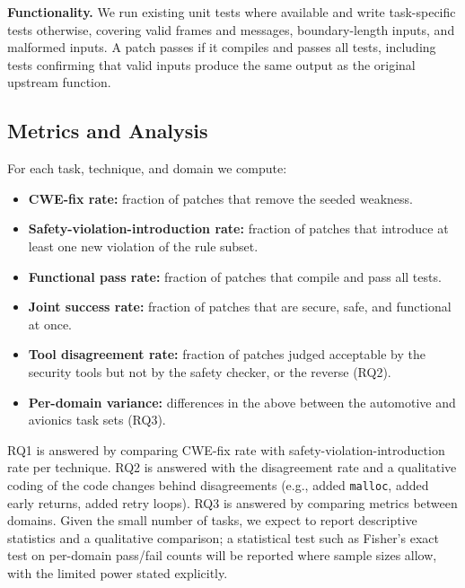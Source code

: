\documentclass[12pt]{IEEEtran}
\begin{document}
\textbf{Functionality.} We run existing unit tests where available and write task-specific tests otherwise, covering valid frames and messages, boundary-length inputs, and malformed inputs. A patch passes if it compiles and passes all tests, including tests confirming that valid inputs produce the same output as the original upstream function.

\subsection{Metrics and Analysis}
For each task, technique, and domain we compute:
\begin{itemize}
    \item \textbf{CWE-fix rate:} fraction of patches that remove the seeded weakness.
    \item \textbf{Safety-violation-introduction rate:} fraction of patches that introduce at least one new violation of the rule subset.
    \item \textbf{Functional pass rate:} fraction of patches that compile and pass all tests.
    \item \textbf{Joint success rate:} fraction of patches that are secure, safe, and functional at once.
    \item \textbf{Tool disagreement rate:} fraction of patches judged acceptable by the security tools but not by the safety checker, or the reverse (RQ2).
    \item \textbf{Per-domain variance:} differences in the above between the automotive and avionics task sets (RQ3).
\end{itemize}
RQ1 is answered by comparing CWE-fix rate with safety-violation-introduction rate per technique. RQ2 is answered with the disagreement rate and a qualitative coding of the code changes behind disagreements (e.g., added \texttt{malloc}, added early returns, added retry loops). RQ3 is answered by comparing metrics between domains. Given the small number of tasks, we expect to report descriptive statistics and a qualitative comparison; a statistical test such as Fisher's exact test on per-domain pass/fail counts will be reported where sample sizes allow, with the limited power stated explicitly.
\end{document}
